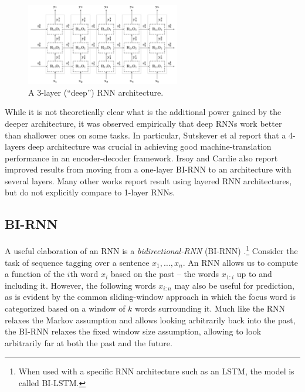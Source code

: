 \documentclass[jair,twoside,11pt,theapa]{article}
\renewcommand{\shortcite}[0]{\citeyear}
\begin{document}
{\begin{figure}[h!t]
    \begin{center}
    \includegraphics[width=0.6\textwidth]{stacked-rnn.pdf} 
    \end{center}
    \caption{A 3-layer (``deep'') RNN architecture.}
    \label{fig:stacked-rnn}
\end{figure}


While it is not theoretically clear what is
the additional power gained by the deeper architecture, it was observed
empirically that deep RNNs work better than shallower ones on some tasks.
In particular, Sutskever et al \shortcite{sutskever2014sequence} report that a
4-layers deep architecture was crucial in achieving good machine-translation
performance in an encoder-decoder framework. Irsoy and Cardie
\shortcite{irsoy2014opinion} also report improved results from moving from a
one-layer BI-RNN to an architecture with several layers.
Many other works report result
using layered RNN architectures, but do not explicitly compare to
1-layer RNNs.


\subsection{BI-RNN}
A useful elaboration of an RNN is a \emph{bidirectional-RNN} (BI-RNN)
\cite{schuster1997bidirectional,graves2008supervised}.\footnote{When used with a
specific RNN architecture such as an LSTM, the model is called BI-LSTM.}
Consider the task of sequence tagging over a sentence $x_1,\ldots,x_n$.
An RNN allows us to compute a function
of the $i$th word $x_i$ based on the past -- the words $x_{1:i}$ up to and including it.
However, the following words $x_{i:n}$ may also be useful for prediction, as is
evident by the common sliding-window approach in which the focus word is
categorized based on a window of $k$ words surrounding it.
Much like the RNN relaxes the Markov assumption and allows looking
arbitrarily back into the past, the BI-RNN relaxes the fixed
window size assumption, allowing to look arbitrarily far at both the past and
the future.

}
\end{document}
